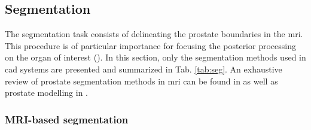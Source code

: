 \subsection{Segmentation} \label{subsec:segmentation}

The segmentation task consists of delineating the prostate boundaries in the \ac{mri}. This procedure is of particular importance for focusing the posterior processing on the organ of interest (\cite{Ghose2012}). In this section, only the segmentation methods used in \ac{cad} systems are presented and summarized in Tab. \ref{tab:seg}. An exhaustive review of prostate segmentation methods in \ac{mri} can be found in \cite{Ghose2012} as well as prostate modelling in \cite{Chilali2014}.

\subsubsection{MRI-based segmentation}

